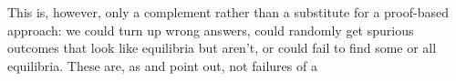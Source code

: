 \documentclass[12pt]{article}
\numberwithin{equation}{subsection}
\begin{document}
This is, however, only a complement rather than a substitute for a proof-based approach: we could
turn up wrong answers, could randomly get spurious outcomes that look like equilibria but aren't, or
could fail to find some or all equilibria.  These are, as \citet{hce:Judd} and \citet{Tukey62} point
out, not failures of a 


%
%
%
\end{document}
